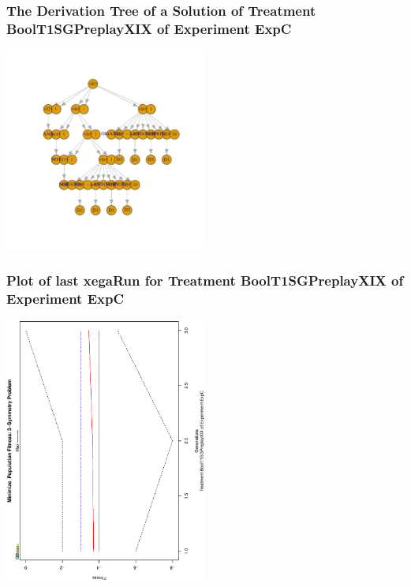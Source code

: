 \documentclass[18pt,c]{beamer}
\begin{document}
 \begin{frame}
 \frametitle{ The Derivation Tree of a Solution of Treatment BoolT1SGPreplayXIX of Experiment ExpC }
 \begin{center}
\includegraphics[width=0.5\textwidth, angle=0]
{ExpCDerivationTreeFigure001.pdf}
 \end{center}
 \label{report/ExpCDerivationTreeFigure001.pdf}  
 \end{frame}

 \begin{frame}
 \frametitle{ Plot of last xegaRun for Treatment BoolT1SGPreplayXIX of Experiment ExpC }
 \begin{center}
\includegraphics[width=0.5\textwidth, angle=-90]
{ExpCPlotPopStatsFigure001.eps}
 \end{center}
 \label{report/ExpCPlotPopStatsFigure001.eps}  
 \end{frame}
\end{document}
